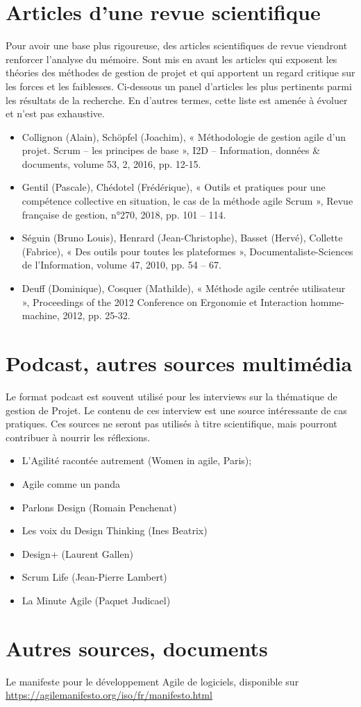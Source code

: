 \section{Articles d’une revue scientifique}
Pour avoir une base plus rigoureuse, des articles scientifiques de revue viendront renforcer l'analyse du mémoire. Sont mis en avant les articles qui exposent les théories des méthodes de gestion de projet et qui apportent un regard critique sur les forces et les faiblesses. 
Ci-dessous un panel d'articles les plus pertinents parmi les résultats de la recherche. En d'autres termes, cette liste est amenée à évoluer et n'est pas exhaustive.
\begin{itemize}
\item Collignon (Alain), Schöpfel (Joachim), « Méthodologie de gestion agile d’un projet. Scrum – les principes de base », I2D – Information, données \& documents, volume 53, 2, 2016, pp. 12-15. 
\item Gentil (Pascale), Chédotel (Frédérique), « Outils et pratiques pour une compétence collective en situation, le cas de la méthode agile Scrum », Revue française de gestion, n°270, 2018, pp. 101 – 114. 
\item Séguin (Bruno Louis), Henrard (Jean-Christophe), Basset (Hervé), Collette (Fabrice), « Des outils pour toutes les plateformes », Documentaliste-Sciences de l'Information, volume 47, 2010, pp. 54 – 67. 
\item Deuff (Dominique), Cosquer (Mathilde), « Méthode agile centrée utilisateur », Proceedings of the 2012 Conference on Ergonomie et Interaction homme-machine, 2012, pp. 25-32. 
\end{itemize}

\section{Podcast, autres sources multimédia}
Le format podcast est souvent utilisé pour les interviews sur la thématique de gestion de Projet. Le contenu de ces interview est une source intéressante de cas pratiques. Ces sources ne seront pas utilisés à titre scientifique, mais pourront contribuer à nourrir les réflexions.

\begin{itemize}
\item L'Agilité racontée autrement (Women in agile, Paris);
\item Agile comme un panda
\item Parlons Design (Romain Penchenat)
\item Les voix du Design Thinking (Ines Beatrix)
\item Design+ (Laurent Gallen)
\item Scrum Life (Jean-Pierre Lambert)
\item La Minute Agile (Paquet Judicael)
\end{itemize}


\section{Autres sources, documents}
Le manifeste pour le développement Agile de logiciels, disponible sur \url{https://agilemanifesto.org/iso/fr/manifesto.html} 
